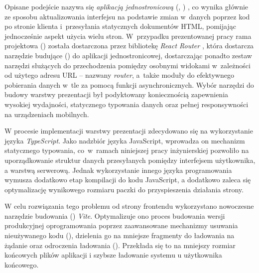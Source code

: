 Opisane podejście nazywa się \textit{aplikacją jednostronicową} (, ) \cite{mdn_spa}, co wynika głównie ze sposobu aktualizowania interfejsu na podstawie zmian w~danych poprzez kod po stronie klienta i~przesyłania statycznych dokumentów HTML, pomijając jednocześnie aspekt użycia wielu stron. W~przypadku prezentowanej pracy rama projektowa () została dostarczona przez bibliotekę \textit{React Router} \cite{react_router}, która dostarcza narzędzie budujące () do aplikacji jednostronicowej, dostarczając ponadto zestaw narzędzi służących do przechodzenia pomiędzy osobnymi widokami w~zależności od użytego adresu URL -- nazwany \textit{router}, a~także moduły do efektywnego pobierania danych w~tle za pomocą funkcji asynchronicznych. Wybór narzędzi do budowy warstwy prezentacji był podyktowany koniecznością zapewnienia wysokiej wydajności, statycznego typowania danych oraz pełnej responsywności na urządzeniach mobilnych.

W procesie implementacji warstwy prezentacji zdecydowano się na wykorzystanie języka \textit{TypeScript}. Jako nadzbiór języka JavaScript, wprowadza on mechanizm statycznego typowania, co~w~ramach niniejszej pracy inżynierskiej pozwoliło na uporządkowanie struktur danych przesyłanych pomiędzy interfejsem użytkownika, a warstwą serwerową. Jednak wykorzystanie innego języka programowania wymusza dodatkowo etap kompilacji do kodu JavaScript, a dodatkowo zaleca się optymalizację wynikowego rozmiaru paczki do przyspieszenia działania strony. 

W celu rozwiązania tego problemu od strony frontendu wykorzystano nowoczesne narzędzie budowania () \textit{Vite}. Optymalizuje ono proces budowania wersji produkcyjnej oprogramowania poprzez zaawansowane mechanizmy usuwania nieużywanego kodu (), dzielenia go na mniejsze fragmenty do ładowania na żądanie oraz odroczenia ładowania (). Przekłada się to na mniejszy rozmiar końcowych plików aplikacji i szybsze ładowanie systemu u użytkownika końcowego.

